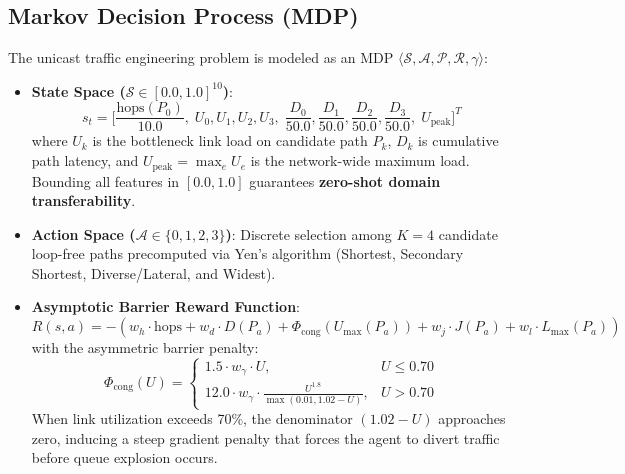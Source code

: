 \documentclass[11pt,a4paper]{article}
\begin{document}
\subsection{Markov Decision Process (MDP)}
The unicast traffic engineering problem is modeled as an MDP $\langle \mathcal{S}, \mathcal{A}, \mathcal{P}, \mathcal{R}, \gamma \rangle$:
\begin{itemize}[leftmargin=*]
    \item \textbf{State Space ($\mathcal{S} \in [0.0, 1.0]^{10}$)}:
    \begin{equation}
        s_t = \Big[ \frac{\text{hops}(P_0)}{10.0}, \; U_0, U_1, U_2, U_3, \; \frac{D_0}{50.0}, \frac{D_1}{50.0}, \frac{D_2}{50.0}, \frac{D_3}{50.0}, \; U_{\text{peak}} \Big]^T
    \end{equation}
    where $U_k$ is the bottleneck link load on candidate path $P_k$, $D_k$ is cumulative path latency, and $U_{\text{peak}} = \max_e U_e$ is the network-wide maximum load. Bounding all features in $[0.0, 1.0]$ guarantees \textbf{zero-shot domain transferability}.
    
    \item \textbf{Action Space ($\mathcal{A} \in \{0, 1, 2, 3\}$)}: Discrete selection among $K=4$ candidate loop-free paths precomputed via Yen's algorithm (Shortest, Secondary Shortest, Diverse/Lateral, and Widest).

    \item \textbf{Asymptotic Barrier Reward Function}:
    \begin{equation}
        R(s, a) = - \left( w_h \cdot \text{hops} + w_d \cdot D(P_a) + \Phi_{\text{cong}}(U_{\max}(P_a)) + w_j \cdot J(P_a) + w_l \cdot L_{\max}(P_a) \right)
    \end{equation}
    with the asymmetric barrier penalty:
    \begin{equation}
        \Phi_{\text{cong}}(U) = 
        \begin{cases} 
            1.5 \cdot w_\gamma \cdot U, & U \le 0.70 \\
            12.0 \cdot w_\gamma \cdot \frac{U^{1.8}}{\max(0.01, 1.02 - U)}, & U > 0.70
        \end{cases}
    \end{equation}
    When link utilization exceeds 70\%, the denominator $(1.02 - U)$ approaches zero, inducing a steep gradient penalty that forces the agent to divert traffic before queue explosion occurs.
\end{itemize}
\end{document}
